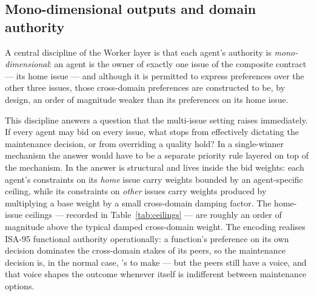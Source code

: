 
\subsection{Mono-dimensional outputs and domain authority}
\label{subsec:mono-dim}

A central discipline of the Worker layer is that each agent's authority
is \emph{mono-dimensional}: an agent is the owner of exactly one issue
of the composite contract --- its home issue --- and although it is
permitted to express preferences over the other three issues, those
cross-domain preferences are constructed to be, by design, an order of
magnitude weaker than its preferences on its home issue.

This discipline answers a question that the multi-issue setting raises
immediately. If every agent may bid on every issue, what stops \QCA{}
from effectively dictating the maintenance decision, or \PSA{} from
overriding a quality hold? In a single-winner mechanism the answer
would have to be a separate priority rule layered on top of the
mechanism. In \NEXUS{} the answer is structural and lives inside the
bid weights: each agent's constraints on its \emph{home} issue carry
weights bounded by an agent-specific ceiling, while its constraints on
\emph{other} issues carry weights produced by multiplying a base weight
by a small cross-domain damping factor. The home-issue ceilings ---
recorded in Table~\ref{tab:ceilings} --- are roughly an order of
magnitude above the typical damped cross-domain weight. The encoding
realises ISA-95 functional authority operationally: a function's
preference on its own decision dominates the cross-domain stakes of its
peers, so the maintenance decision is, in the normal case, \PMA{}'s to
make --- but the peers still have a voice, and that voice shapes the
outcome whenever \PMA{} itself is indifferent between maintenance
options.

